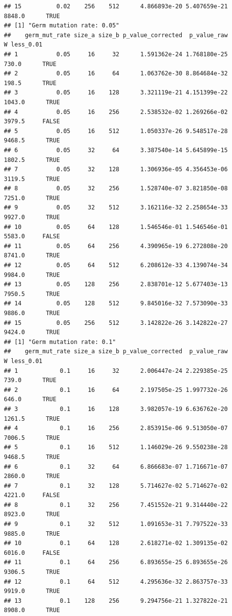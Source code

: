 \documentclass[
]{book}
\begin{document}
\begin{verbatim}
## 15          0.02    256    512      4.866893e-20 5.407659e-21 8848.0      TRUE
## [1] "Germ mutation rate: 0.05"
##    germ_mut_rate size_a size_b p_value_corrected  p_value_raw      W less_0.01
## 1           0.05     16     32      1.591362e-24 1.768180e-25  730.0      TRUE
## 2           0.05     16     64      1.063762e-30 8.864684e-32  198.5      TRUE
## 3           0.05     16    128      3.321119e-21 4.151399e-22 1043.0      TRUE
## 4           0.05     16    256      2.538532e-02 1.269266e-02 3979.5     FALSE
## 5           0.05     16    512      1.050337e-26 9.548517e-28 9468.5      TRUE
## 6           0.05     32     64      3.387540e-14 5.645899e-15 1802.5      TRUE
## 7           0.05     32    128      1.306936e-05 4.356453e-06 3119.5      TRUE
## 8           0.05     32    256      1.528740e-07 3.821850e-08 7251.0      TRUE
## 9           0.05     32    512      3.162116e-32 2.258654e-33 9927.0      TRUE
## 10          0.05     64    128      1.546546e-01 1.546546e-01 5583.0     FALSE
## 11          0.05     64    256      4.390965e-19 6.272808e-20 8741.0      TRUE
## 12          0.05     64    512      6.208612e-33 4.139074e-34 9984.0      TRUE
## 13          0.05    128    256      2.838701e-12 5.677403e-13 7950.5      TRUE
## 14          0.05    128    512      9.845016e-32 7.573090e-33 9886.0      TRUE
## 15          0.05    256    512      3.142822e-26 3.142822e-27 9424.0      TRUE
## [1] "Germ mutation rate: 0.1"
##    germ_mut_rate size_a size_b p_value_corrected  p_value_raw      W less_0.01
## 1            0.1     16     32      2.006447e-24 2.229385e-25  739.0      TRUE
## 2            0.1     16     64      2.197505e-25 1.997732e-26  646.0      TRUE
## 3            0.1     16    128      3.982057e-19 6.636762e-20 1261.5      TRUE
## 4            0.1     16    256      2.853915e-06 9.513050e-07 7006.5      TRUE
## 5            0.1     16    512      1.146029e-26 9.550238e-28 9468.5      TRUE
## 6            0.1     32     64      6.866683e-07 1.716671e-07 2860.0      TRUE
## 7            0.1     32    128      5.714627e-02 5.714627e-02 4221.0     FALSE
## 8            0.1     32    256      7.451552e-21 9.314440e-22 8923.0      TRUE
## 9            0.1     32    512      1.091653e-31 7.797522e-33 9885.0      TRUE
## 10           0.1     64    128      2.618271e-02 1.309135e-02 6016.0     FALSE
## 11           0.1     64    256      6.893655e-25 6.893655e-26 9306.5      TRUE
## 12           0.1     64    512      4.295636e-32 2.863757e-33 9919.0      TRUE
## 13           0.1    128    256      9.294756e-21 1.327822e-21 8908.0      TRUE

\end{verbatim}
\end{document}
